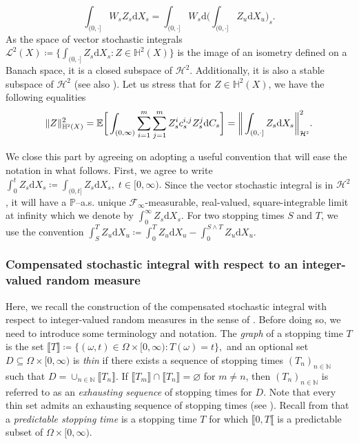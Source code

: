 \documentclass[10pt]{article} %
\newcommand\cF{\mathcal F}
\newcommand\cH{\mathcal H}
\newcommand\cL{\mathcal L}
\newcommand{\smalltext}[1]{\text{\fontsize{4}{4}\selectfont$#1$}}
\def \E{\mathbb{E}}
\def \H{\mathbb{H}}
\def \N{\mathbb{N}}
\def \P{\mathbb{P}}
\def\d{\mathrm{d}}
\begin{document}
		\begin{equation*}
			\int_{(0,\cdot]} W_sZ_s \d X_s = \int_{(0,\cdot]} W_s \d \bigg( \int_{(0,\cdot]} Z_u \d X_u \bigg)_s.
		\end{equation*}
As the space of vector stochastic integrals $\cL^2(X) \coloneqq \big\{ \int_{(0,\cdot]} Z_s \d X_s : Z \in \H^2(X) \big\}$ is the image of an isometry defined on a Banach space, it is a closed subspace of $\cH^2$. Additionally, it is also a stable subspace of $\cH^2$ (see also \cite[Definition 4.4 and Theorem 4.35]{jacod1979calcul}). Let us stress that for $Z \in \H^2(X)$, we have the following equalities
\begin{equation*}
	\|Z\|^2_{\H^\smalltext{2}(X)} = \E \bigg[ \int_{(0,\infty)}  \sum_{i=1}^m\sum_{j=1}^m Z^i_s c^{i,j}_s Z^j_s  \d C_s \bigg] = \bigg\| \int_{(0,\cdot]} Z_s \d X_s \bigg\|^2_{\cH^\smalltext{2}}.
\end{equation*}

We close this part by agreeing on adopting a useful convention that will ease the notation in what follows. First, we agree to write $\int_0^t Z_s \d X_s \coloneqq \int_{(0,t]} Z_s \d X_s, \; t \in [0,\infty).$ Since the vector stochastic integral is in $\cH^2$, it will have a $\P$--a.s. unique $\cF_\infty$-measurable, real-valued, square-integrable limit at infinity which we denote by $
 	\int_0^\infty Z_s \d X_s.$ For two stopping times $S$ and $T$, we use the convention $\int_S^T Z_u \d X_u \coloneqq \int_0^T Z_u \d X_u - \int_0^{S\land T} Z_u \d X_u.$

\subsubsection{Compensated stochastic integral with respect to an integer-valued random measure}\label{sec::compensated_si}

Here, we recall the construction of the compensated stochastic integral with respect to integer-valued random measures in the sense of \cite{cohen2015stochastic,jacod1979calcul,jacod2003limit}. Before doing so, we need to introduce some terminology and notation. The \emph{graph} of a stopping time $T$ is the set $\llbracket T \rrbracket \coloneqq \{(\omega,t) \in \Omega \times [0,\infty): T(\omega)= t\},$ and an optional set $D \subseteq \Omega \times [0,\infty)$ is \emph{thin} if there exists a sequence of stopping times $(T_n)_{n \in \N}$ such that $D = \cup_{n \in \N} \llbracket T_n \rrbracket.$ If $\llbracket T_m \rrbracket \cap \llbracket T_n \rrbracket = \varnothing$ for $m \neq n$, then $(T_n)_{n \in \N}$ is referred to as an \emph{exhausting sequence} of stopping times for $D$. Note that every thin set admits an exhausting sequence of stopping times (see \cite[Lemma I.1.31]{jacod2003limit}). Recall from  that a \emph{predictable stopping time} is a stopping time $T$ for which $\llbracket 0,T\llbracket$ is a predictable subset of $\Omega \times [0,\infty)$.
\end{document}
